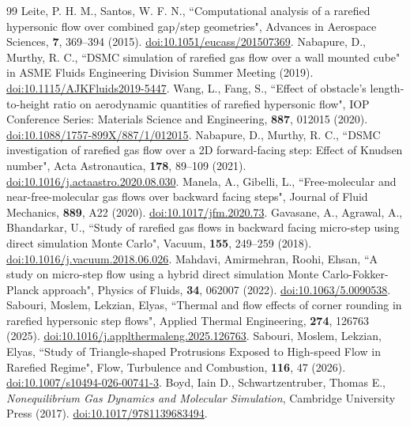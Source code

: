 \documentclass[aip,pof,preprint,floatfix,amsmath,amssymb]{revtex4-2}
\begin{document}
\begin{thebibliography}{99}
 Leite, P. H. M., Santos, W. F. N., ``Computational analysis of a rarefied hypersonic flow over combined gap/step geometries", Advances in Aerospace Sciences, \textbf{7}, 369--394 (2015). \href{https://doi.org/10.1051/eucass/201507369}{doi:10.1051/eucass/201507369}.
 Nabapure, D., Murthy, R. C., ``DSMC simulation of rarefied gas flow over a wall mounted cube" in ASME Fluids Engineering Division Summer Meeting (2019). \href{https://doi.org/10.1115/AJKFluids2019-5447}{doi:10.1115/AJKFluids2019-5447}.
 Wang, L., Fang, S., ``Effect of obstacle's length-to-height ratio on aerodynamic quantities of rarefied hypersonic flow", IOP Conference Series: Materials Science and Engineering, \textbf{887}, 012015 (2020). \href{https://doi.org/10.1088/1757-899X/887/1/012015}{doi:10.1088/1757-899X/887/1/012015}.
 Nabapure, D., Murthy, R. C., ``DSMC investigation of rarefied gas flow over a 2D forward-facing step: Effect of Knudsen number", Acta Astronautica, \textbf{178}, 89--109 (2021). \href{https://doi.org/10.1016/j.actaastro.2020.08.030}{doi:10.1016/j.actaastro.2020.08.030}.
 Manela, A., Gibelli, L., ``Free-molecular and near-free-molecular gas flows over backward facing steps", Journal of Fluid Mechanics, \textbf{889}, A22 (2020). \href{https://doi.org/10.1017/jfm.2020.73}{doi:10.1017/jfm.2020.73}.
 Gavasane, A., Agrawal, A., Bhandarkar, U., ``Study of rarefied gas flows in backward facing micro-step using direct simulation Monte Carlo", Vacuum, \textbf{155}, 249--259 (2018). \href{https://doi.org/10.1016/j.vacuum.2018.06.026}{doi:10.1016/j.vacuum.2018.06.026}.
 Mahdavi, Amirmehran, Roohi, Ehsan, ``A study on micro-step flow using a hybrid direct simulation Monte Carlo-Fokker-Planck approach", Physics of Fluids, \textbf{34}, 062007 (2022). \href{https://doi.org/10.1063/5.0090538}{doi:10.1063/5.0090538}.
 Sabouri, Moslem, Lekzian, Elyas, ``Thermal and flow effects of corner rounding in rarefied hypersonic step flows", Applied Thermal Engineering, \textbf{274}, 126763 (2025). \href{https://doi.org/10.1016/j.applthermaleng.2025.126763}{doi:10.1016/j.applthermaleng.2025.126763}.
 Sabouri, Moslem, Lekzian, Elyas, ``Study of Triangle-shaped Protrusions Exposed to High-speed Flow in Rarefied Regime", Flow, Turbulence and Combustion, \textbf{116}, 47 (2026). \href{https://doi.org/10.1007/s10494-026-00741-3}{doi:10.1007/s10494-026-00741-3}.
 Boyd, Iain D., Schwartzentruber, Thomas E., \emph{Nonequilibrium Gas Dynamics and Molecular Simulation}, Cambridge University Press (2017). \href{https://doi.org/10.1017/9781139683494}{doi:10.1017/9781139683494}.

\end{thebibliography}
\end{document}
